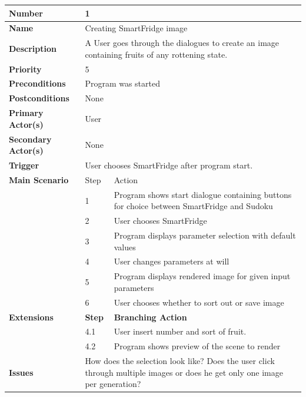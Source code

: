 \documentclass[a4paper,12pt]{article}
\begin{document}
\begin{tabularx}{\linewidth}{|l|l|X|}
\hline
\textbf{Number} & \multicolumn{2}{l|}{1} \\
\hline
\textbf{Name} & \multicolumn{2}{l|}{Creating SmartFridge image} \\
\hline
\textbf{Description} &  \multicolumn{2}{X|}{A User goes through the dialogues to create an image containing fruits of any rottening state.} \\
\hline
\textbf{Priority} & \multicolumn{2}{l|}{5} \\
\hline
\textbf{Preconditions} & \multicolumn{2}{l|}{Program was started} \\
\hline
\textbf{Postconditions} & \multicolumn{2}{l|}{None} \\
\hline
\textbf{Primary Actor(s)} & \multicolumn{2}{l|}{User} \\
\hline
\textbf{Secondary Actor(s)} & \multicolumn{2}{l|}{None} \\
\hline
\textbf{Trigger} & \multicolumn{2}{l|}{User chooses SmartFridge after program start.} \\
\hline
\textbf{Main Scenario} & Step & Action\\
\hline
 & 1 & Program shows start dialogue containing buttons for choice between SmartFridge and Sudoku\\
\cline{2-3}
 & 2 & User chooses SmartFridge\\
\cline{2-3}
 & 3 & Program displays parameter selection with default values\\
\cline{2-3}
 & 4 & User changes parameters at will \\
\cline{2-3}
 & 5 & Program displays rendered image for given input parameters \\
\cline{2-3}
 & 6 & User chooses whether to sort out or save image \\
\hline
\textbf{Extensions} & \textbf{Step} & \textbf{Branching Action} \\
\hline
& 4.1 & User insert number and sort of fruit. \\
\cline{2-3}
& 4.2 & Program shows preview of the scene to render \\
\hline
\textbf{Issues} & \multicolumn{2}{X|}{How does the selection look like? Does the user click through multiple images or does he get only one image per generation?} \\
\hline
\end{tabularx}
 \\
 \\
 \\
\end{document}
